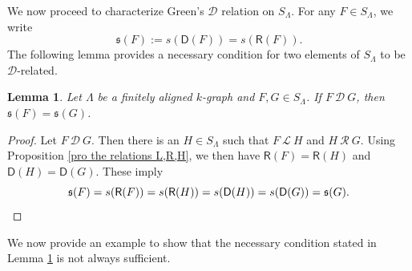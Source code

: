 \documentclass[a4paper,reqno,11pt]{amsart}
\numberwithin{equation}{section}
\newtheorem{lem}[thm]{Lemma}
\theoremstyle{definition}
\theoremstyle{remark}
\begin{document}
We now proceed to characterize Green's $\mathscr{D}$ relation on $S_\Lambda$. For any $F\in S_\Lambda$, we write \[\mathfrak{s}(F):=s(\mathsf{D}(F))=s(\mathsf{R}(F)).\] The following lemma provides a necessary condition for two elements of $S_\Lambda$ to be $\mathscr{D}$-related.
\begin{lem}\label{lem Necessary condition for D}
Let $\Lambda$ be a finitely aligned $k$-graph and $F,G\in S_\Lambda$. If $F~\mathscr{D}~G$, then $\mathfrak{s}(F)=\mathfrak{s}(G)$.   
\end{lem}
\begin{proof}
Let $F~\mathscr{D}~G$. Then there is an $H\in S_\Lambda$ such that $F~\mathscr{L}~H$ and $H~\mathscr{R}~G$. Using Proposition \ref{pro the relations L,R,H}, we then have $\mathsf{R}(F)=\mathsf{R}(H)$ and $\mathsf{D}(H)=\mathsf{D}(G)$. These imply \[\mathfrak{s}(F)=s(\mathsf{R}(F))=s(\mathsf{R}(H))=s(\mathsf{D}(H))=s(\mathsf{D}(G))=\mathfrak{s}(G).\qedhere \] 
\end{proof}
We now provide an example to show that the necessary condition stated in Lemma \ref{lem Necessary condition for D} is not always sufficient.
\end{document}

